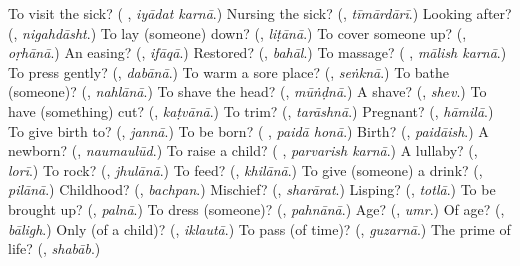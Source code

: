 \begin{tcolorbox}[breakable,colback=teal!4,colframe=teal!35!black,title={Before you move on}]
To visit the sick? (\textbf{ }, \emph{iyādat karnā}.) Nursing the sick? (\textbf{}, \emph{tīmārdārī}.) Looking after? (\textbf{}, \emph{nigahdāsht}.) To lay (someone) down? (\textbf{}, \emph{liṭānā}.) To cover someone up? (\textbf{}, \emph{oṛhānā}.) An easing? (\textbf{}, \emph{ifāqā}.) Restored? (\textbf{}, \emph{bahāl}.) To massage? (\textbf{ }, \emph{mālish karnā}.) To press gently? (\textbf{}, \emph{dabānā}.) To warm a sore place? (\textbf{}, \emph{seṅknā}.) To bathe (someone)? (\textbf{}, \emph{nahlānā}.) To shave the head? (\textbf{}, \emph{mūṅḍnā}.) A shave? (\textbf{}, \emph{shev}.) To have (something) cut? (\textbf{}, \emph{kaṭvānā}.) To trim? (\textbf{}, \emph{tarāshnā}.) Pregnant? (\textbf{}, \emph{hāmilā}.) To give birth to? (\textbf{}, \emph{jannā}.) To be born? (\textbf{ }, \emph{paidā honā}.) Birth? (\textbf{}, \emph{paidāish}.) A newborn? (\textbf{}, \emph{naumaulūd}.) To raise a child? (\textbf{ }, \emph{parvarish karnā}.) A lullaby? (\textbf{}, \emph{lorī}.) To rock? (\textbf{}, \emph{jhulānā}.) To feed? (\textbf{}, \emph{khilānā}.) To give (someone) a drink? (\textbf{}, \emph{pilānā}.) Childhood? (\textbf{}, \emph{bachpan}.) Mischief? (\textbf{}, \emph{sharārat}.) Lisping? (\textbf{}, \emph{totlā}.) To be brought up? (\textbf{}, \emph{palnā}.) To dress (someone)? (\textbf{}, \emph{pahnānā}.) Age? (\textbf{}, \emph{umr}.) Of age? (\textbf{}, \emph{bāligh}.) Only (of a child)? (\textbf{}, \emph{iklautā}.) To pass (of time)? (\textbf{}, \emph{guzarnā}.) The prime of life? (\textbf{}, \emph{shabāb}.)
\end{tcolorbox}

